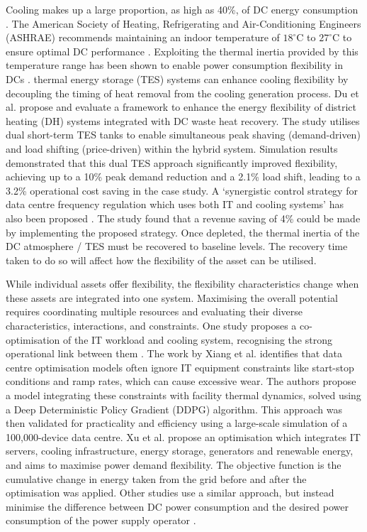\documentclass[lettersize,journal]{IEEEtran}
\providecommand{\DIFadd}[1]{{\color{blue}#1}}
\providecommand{\DIFaddbegin}{}
\providecommand{\DIFaddend}{}
\begin{document}
Cooling makes up a large proportion, as high as 40\%, of DC energy consumption \cite{zhao2021synthetic}. The American Society of Heating, Refrigerating and Air-Conditioning Engineers (ASHRAE) recommends maintaining an indoor temperature of $18^\circ\mathrm{C}$ to $27^\circ\mathrm{C}$ to ensure optimal DC performance \cite{tc2016data}. Exploiting the thermal inertia provided by this temperature range has been shown to enable power consumption flexibility in DCs  \DIFaddbegin \DIFadd{\cite{takci2025data,ref22}. thermal energy storage }\DIFaddend (TES) systems can enhance cooling flexibility by decoupling the timing of heat removal from the cooling generation process.
Du et al. \cite{du2025new} propose and evaluate a framework to enhance the energy flexibility of district heating (DH) systems integrated with DC waste heat recovery. The study utilises dual short-term TES tanks to enable simultaneous peak shaving (demand-driven) and load shifting (price-driven) within the hybrid system. Simulation results demonstrated that this dual TES approach significantly improved flexibility, achieving up to a 10\% peak demand reduction and a 2.1\% load shift, leading to a 3.2\% operational cost saving in the case study. A `synergistic control strategy for data centre frequency regulation which uses both IT and cooling systems' has also been proposed  \DIFaddbegin \DIFadd{\cite{Fu2020ApEn}. The study }\DIFaddend found that a revenue saving of 4\% could be made by implementing the proposed strategy. Once depleted, the thermal inertia of the DC atmosphere / TES must be recovered to baseline levels. The recovery time taken to do so will affect how the flexibility of the asset can be utilised.


While individual assets offer flexibility, the flexibility characteristics change when these assets are integrated into one system. Maximising the overall potential requires coordinating multiple resources and evaluating their diverse characteristics, interactions, and constraints. One study proposes a co-optimisation of the IT workload and cooling system, recognising the strong operational link between them  \DIFaddbegin \DIFadd{\cite{Fu2020ApEn}}\DIFaddend . The work by  Xiang et al. \cite{xiang2023modeling} identifies that data centre optimisation models often ignore IT equipment constraints like start-stop conditions and ramp rates, which can cause excessive wear. The authors propose a model integrating these constraints with facility thermal dynamics, solved using a Deep Deterministic Policy Gradient (DDPG) algorithm. This approach was then validated for practicality and efficiency using a large-scale simulation of a 100,000-device data centre.
 Xu et al.  \DIFaddbegin \DIFadd{\cite{Xu2023SPIE} }\DIFaddend propose an optimisation which integrates IT servers, cooling infrastructure, energy storage, generators and renewable energy, and aims to maximise power demand flexibility. The objective function is the cumulative change in energy taken from the grid before and after the optimisation was applied. 
Other studies use a similar approach, but instead minimise the difference between DC power consumption and the desired power consumption of the power supply operator \cite{cioara2018optimized}. 
\end{document}
